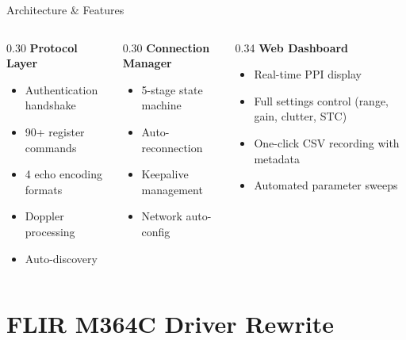 \documentclass[10pt, aspectratio=169]{beamer}
\begin{document}
\begin{frame}{Architecture \& Features}
  \begin{columns}[T]
    \begin{column}{0.30\textwidth}
      \textbf{Protocol Layer}
      \begin{itemize}
        \item Authentication handshake
        \item 90+ register commands
        \item 4 echo encoding formats
        \item Doppler processing
        \item Auto-discovery
      \end{itemize}
    \end{column}
    \begin{column}{0.30\textwidth}
      \textbf{Connection Manager}
      \begin{itemize}
        \item 5-stage state machine
        \item Auto-reconnection
        \item Keepalive management
        \item Network auto-config
      \end{itemize}
    \end{column}
    \begin{column}{0.34\textwidth}
      \textbf{Web Dashboard}
      \begin{itemize}
        \item Real-time PPI display
        \item Full settings control (range, gain, clutter, STC)
        \item One-click CSV recording with metadata
        \item Automated parameter sweeps
      \end{itemize}
    \end{column}
  \end{columns}
\end{frame}

\section{FLIR M364C Driver Rewrite}
\end{document}
